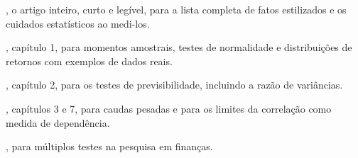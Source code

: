 \begin{leituras}
  \item \citet{cont2001}, o artigo inteiro, curto e legível, para a lista completa de fatos estilizados e os cuidados estatísticos ao medi-los.
  \item \citet{tsay2010}, capítulo 1, para momentos amostrais, testes de normalidade e distribuições de retornos com exemplos de dados reais.
  \item \citet{campbell1997}, capítulo 2, para os testes de previsibilidade, incluindo a razão de variâncias.
  \item \citet{mcneil2015}, capítulos 3 e 7, para caudas pesadas e para os limites da correlação como medida de dependência.
  \item \citet{harvey2016}, para múltiplos testes na pesquisa em finanças.
\end{leituras}
